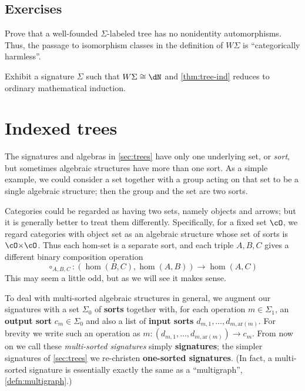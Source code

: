 \documentclass{book}
\def\ay{\mathrm{ar}}
\def\sig{\Sigma}
\begin{document}
\subsection*{Exercises}

\begin{ex}\label{ex:wf-rigid}
  Prove that a well-founded $\sig$-labeled tree has no nonidentity automorphisms.
  Thus, the passage to isomorphism classes in the definition of $W\sig$ is ``categorically harmless''.
\end{ex}

\begin{ex}\label{ex:natw}
  Exhibit a signature $\sig$ such that $W\sig \cong \dN$ and \cref{thm:tree-ind} reduces to ordinary mathematical induction.
\end{ex}


\section{Indexed trees}
\label{sec:indexed-trees}

The signatures and algebras in \cref{sec:trees} have only one underlying set, or \emph{sort}, but sometimes algebraic structures have more than one sort.
As a simple example, we could consider a set together with a group acting on that set to be a single algebraic structure; then the group and the set are two sorts.

Categories could be regarded as having two sets, namely objects and arrows; but it is generally better to treat them differently.
Specifically, for a fixed set $\cO$, we regard categories with object set \cO as an algebraic structure whose set of sorts is $\cO\times \cO$.
Thus each hom-set is a separate sort, and each triple $A,B,C$ gives a different binary composition operation
\[ \circ_{A,B,C} : (\hom(B,C),\hom(A,B)) \to \hom(A,C) \]
This may seem a little odd, but as we will see it makes sense.

To deal with multi-sorted algebraic structures in general, we augment our signatures with a set $\sig_0$ of \textbf{sorts} together with, for each operation $m\in\sig_1$, an \textbf{output sort} $c_m\in\sig_0$ and also a list of \textbf{input sorts} $d_{m,1},\dots,d_{m,\ay(m)}$.
For brevity we write such an operation as $m:(d_{m,1},\dots,d_{m,\ay(m)}) \to c_m$.
From now on we call these \emph{multi-sorted signatures} simply \textbf{signatures}; the simpler signatures of \cref{sec:trees} we re-christen \textbf{one-sorted signatures}.
(In fact, a multi-sorted signature is essentially exactly the same as a ``multigraph'', \cref{defn:multigraph}.)
\end{document}

